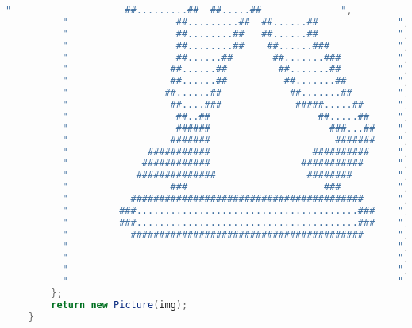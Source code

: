 \begin{lstlisting}[language=java, caption={Representacion en ascii del soldado}]
          "                    ##.........##  ##.....##              ",
          "                   ##.........##  ##......##              ",
          "                   ##........##   ##......##              ",
          "                   ##........##    ##......###            ",
          "                   ##......##       ##.......###          ",
          "                  ##......##         ##.......##          ",
          "                  ##......##          ##.......##         ",
          "                 ##......##            ##.......##        ",
          "                  ##....###             #####.....##      ",
          "                   ##..##                   ##.....##     ",
          "                   ######                     ###...##    ",
          "                  #######                      #######    ",
          "              ###########                  ##########     ",
          "             ############                ###########      ",
          "            ##############                ########        ",
          "                  ###                        ###          ",
          "           #########################################      ",
          "         ###.......................................###    ",
          "         ###.......................................###    ",
          "           #########################################      ",
          "                                                          ",
          "                                                          ",
          "                                                          ",
          "                                                          "		
		};
		return new Picture(img);
	}
\end{lstlisting}
